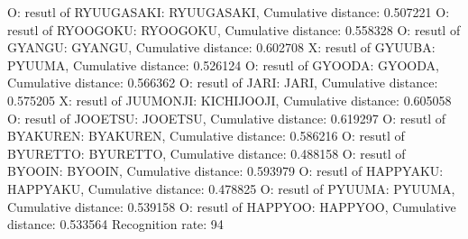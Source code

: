 O: resutl of RYUUGASAKI: RYUUGASAKI, Cumulative distance: 0.507221
O: resutl of RYOOGOKU: RYOOGOKU, Cumulative distance: 0.558328
O: resutl of GYANGU: GYANGU, Cumulative distance: 0.602708
X: resutl of GYUUBA: PYUUMA, Cumulative distance: 0.526124
O: resutl of GYOODA: GYOODA, Cumulative distance: 0.566362
O: resutl of JARI: JARI, Cumulative distance: 0.575205
X: resutl of JUUMONJI: KICHIJOOJI, Cumulative distance: 0.605058
O: resutl of JOOETSU: JOOETSU, Cumulative distance: 0.619297
O: resutl of BYAKUREN: BYAKUREN, Cumulative distance: 0.586216
O: resutl of BYURETTO: BYURETTO, Cumulative distance: 0.488158
O: resutl of BYOOIN: BYOOIN, Cumulative distance: 0.593979
O: resutl of HAPPYAKU: HAPPYAKU, Cumulative distance: 0.478825
O: resutl of PYUUMA: PYUUMA, Cumulative distance: 0.539158
O: resutl of HAPPYOO: HAPPYOO, Cumulative distance: 0.533564
Recognition rate: 94%
